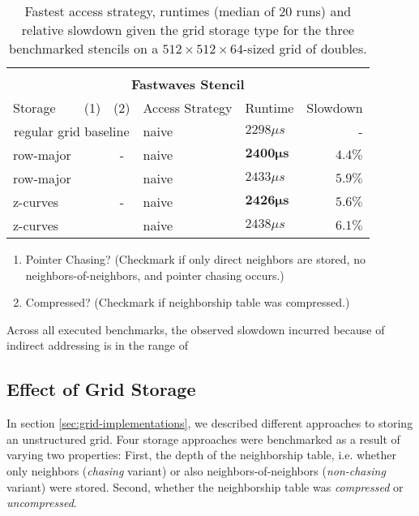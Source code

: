 \begin{table}
\begin{tabular}{l c c l l r}
		\hline
		\hline\\
		\multicolumn{6}{c}{\textbf{Fastwaves Stencil}}\\
		\hline
		\hline
		Storage & (1) & (2) & Access Strategy  & Runtime & Slowdown \\
		\hline
		\multicolumn{3}{c}{regular grid baseline} & naive & $2298 \mu s$ & - \\
		\hline
		row-major & & - & naive & $\mathbf{2400\mu s}$ & $\mathbf{4.4 \%}$ \\
		row-major & & \checkmark & naive & $2433\mu s$ & $5.9 \%$ \\
		\hline
		z-curves & & - & naive & $\mathbf{2426\mu s}$ & $\mathbf{5.6 \%}$ \\
		z-curves & & \checkmark & naive & $2438\mu s$ & $6.1 \%$ \\
		\hline\hline
	\end{tabular}
	\begin{enumerate}[label=(\arabic*)]
		\item Pointer Chasing? (Checkmark if only direct neighbors are stored, no neighbors-of-neighbors, and pointer chasing occurs.)
		\item Compressed? (Checkmark if neighborship table was compressed.)
	\end{enumerate}
	\caption{\label{tab:overview} Fastest access strategy, runtimes (median of 20 runs) and relative slowdown given the grid storage type for the three benchmarked stencils on a $512\times 512\times 64$-sized grid of doubles.}
\end{table}

Across all executed benchmarks, the observed slowdown incurred because of indirect addressing is in the range of $$


\subsection{Effect of Grid Storage}

In section \ref{sec:grid-implementations}, we described different approaches to storing an unstructured grid. Four storage approaches were benchmarked as a result of varying two properties: First, the depth of the neighborship table, i.e. whether only neighbors (\emph{chasing} variant) or also neighbors-of-neighbors (\emph{non-chasing} variant) were stored. Second, whether the neighborship table was \emph{compressed} or \emph{uncompressed}.

